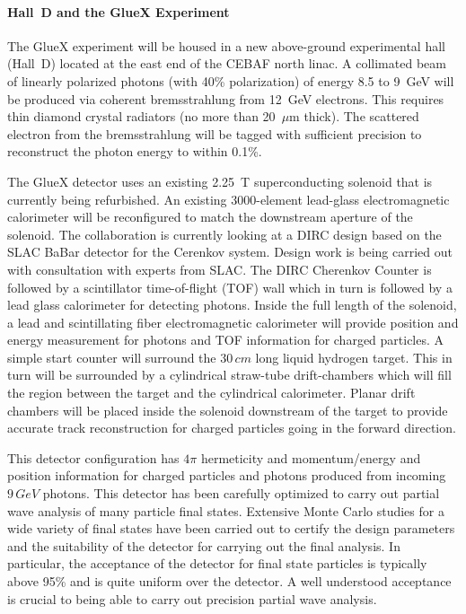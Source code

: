 \paragraph{Hall~D and the GlueX Experiment}

The GlueX experiment will be housed in a new above-ground experimental hall
(Hall~D) located at the east end of the CEBAF north linac. A collimated beam 
of linearly polarized photons (with 40\% polarization) of energy 8.5 to 9~GeV 
will be produced via coherent bremsstrahlung from 12~GeV electrons. This 
requires thin diamond  crystal radiators (no more than 20~$\mu$m thick). 
The scattered electron from the bremsstrahlung will be tagged with sufficient 
precision to reconstruct the photon energy to within 0.1\%.


\hspace{1cm}
The GlueX detector uses an existing 2.25~T 
superconducting solenoid that is currently being refurbished.  An existing 
3000-element lead-glass electromagnetic calorimeter will be reconfigured 
to match the downstream aperture of the solenoid. The collaboration is
currently looking at a DIRC design based on the SLAC BaBar detector for the
Cerenkov system. Design work is being carried out with consultation 
with experts from SLAC. The DIRC Cherenkov Counter is followed by a scintillator 
time-of-flight (TOF) wall which in turn is followed by a lead glass 
calorimeter for detecting photons.  Inside the full length of the solenoid,
a lead and scintillating fiber electromagnetic calorimeter will provide 
position and energy measurement for photons and TOF information for charged 
particles.  A simple start counter will surround the $30\, cm$ long liquid hydrogen
target. This in turn will be surrounded by a cylindrical straw-tube drift-chambers 
which will fill the region between the target and the cylindrical calorimeter.  
Planar drift chambers will be placed inside the solenoid downstream of the target
to provide accurate track reconstruction for charged particles going in the 
forward direction.


\hspace{1cm}
This detector configuration has $4 \pi$ hermeticity and momentum/energy and
position information for charged particles and photons produced from 
incoming $9\, GeV$ photons. This detector has been carefully optimized to 
carry out partial wave analysis of many particle final states.  Extensive Monte 
Carlo studies for a wide variety of final states have been carried out to 
certify the design parameters and the suitability of the detector for carrying 
out the final analysis. In particular, the acceptance of the detector for
final state particles is typically above 95\% and is quite uniform over 
the detector. A well understood acceptance is crucial to being able to carry
out precision partial wave analysis. 


